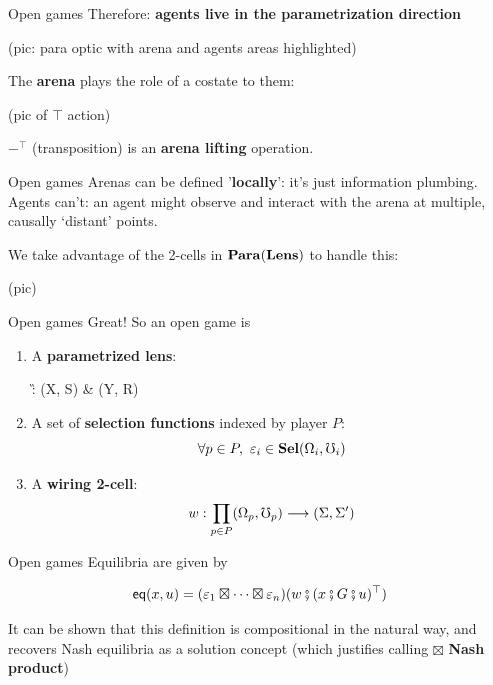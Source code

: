 \begin{frame}{Open games}
	Therefore: \textbf{agents live in the parametrization direction}

	(pic: para optic with arena and agents areas highlighted)

	The \textbf{arena} plays the role of a costate to them:

	(pic of $\top$ action)

	$-^\top$ (transposition) is an \textbf{arena lifting} operation.
\end{frame}

\begin{frame}{Open games}
	Arenas can be defined '\textbf{locally}': it's just information plumbing.
	Agents can't: an agent might observe and interact with the arena at multiple, causally `distant' points.

	We take advantage of the 2-cells in $\mathbf{Para}(\mathbf{Lens})$ to handle this:

	(pic)
\end{frame}

\begin{frame}{Open games}
	Great! So an open game is

	\begin{definition}
		\begin{enumerate}
			\item A \textbf{parametrized lens}:
			\begin{diagram*}
				\G : (X, S)  \& (Y, R)
			\end{diagram*}
			\item A set of \textbf{selection functions} indexed by player $P$:
			\begin{equation*}
				\forall p \in P,\ \varepsilon_i \in \mathbf{Sel}(\Omega_i, \mho_i)
			\end{equation*}
			\item A \textbf{wiring 2-cell}:
			\begin{equation*}
				w : \prod_{p \in P} (\Omega_p, \mho_p) \longrightarrow (\Sigma, \Sigma')
			\end{equation*}
		\end{enumerate}
	\end{definition}
\end{frame}

\begin{frame}{Open games}
	Equilibria are given by

	\begin{equation*}
		\mathsf{eq}(x,u) = (\varepsilon_1 \boxtimes \cdots \boxtimes \varepsilon_n)(w \fatsemi (x \fatsemi G \fatsemi u)^\top)
	\end{equation*}

	It can be shown that this definition is compositional in the natural way, and recovers Nash equilibria as a solution concept (which justifies calling $\boxtimes$ \textbf{Nash product})
\end{frame}

